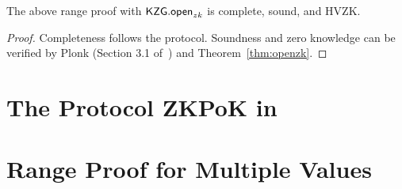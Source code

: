 \begin{theorem}
The above range proof with $\mathsf{KZG.open}_{zk}$ is complete, sound, and HVZK.
\end{theorem}
\begin{proof}
Completeness follows the protocol. Soundness and zero knowledge can be verified by Plonk (Section 3.1 of~\cite{plonk}) and Theorem~\ref{thm:openzk}.
\end{proof}

\section{The Protocol ZKPoK in \bootstrap}
\label{alg:map}

\FloatBarrier

\FloatBarrier

\section{Range Proof for Multiple Values}
\label{alg:rpmv}

\FloatBarrier

\FloatBarrier
